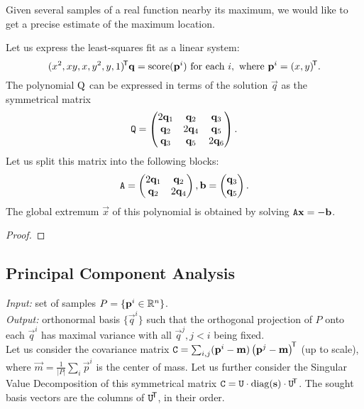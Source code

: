 Given several samples of a real function nearby its maximum, we would like to get a precise estimate of the maximum location.

Let us express the least-squares fit as a linear system:
$$(x^2, xy, x, y^2, y, 1)^{\!\mathsf{T}} \mathbf{q} = \mathrm{score}(\mathbf{p}^i) \text{ for each } i, \text{ where } \mathbf{p}^i = (x, y)^{\!\mathsf{T}}.$$
The polynomial $\mathrm{Q}$ can be expressed in terms of the solution $\vec q$ as the symmetrical matrix
$$\mathtt{Q} = \begin{pmatrix}
 2 \mathbf{q}_1 & \mathbf{q}_2 & \mathbf{q}_3 \\
 \mathbf{q}_2 & 2 \mathbf{q}_4 & \mathbf{q}_5 \\
 \mathbf{q}_3 & \mathbf{q}_5 & 2 \mathbf{q}_6
\end{pmatrix}.$$
Let us split this matrix into the following blocks:
\begin{equation}
\mathtt{A} = \begin{pmatrix}
 2 \mathbf{q}_1 & \mathbf{q}_2 \\
 \mathbf{q}_2 & 2 \mathbf{q}_4 \\
\end{pmatrix},
\mathbf{b} = \begin{pmatrix}
 \mathbf{q}_3 \\
 \mathbf{q}_5 \\
\end{pmatrix}.
\end{equation}
The global extremum $\vec x$ of this polynomial is obtained by solving $\mathtt{A} \mathbf{x} = -\mathbf{b}$.

\begin{proof}
\todo{\dots}
\end{proof}

\subsection{Principal Component Analysis}
\textit{Input:} set of samples $P = \{\mathbf{p}^i \in \mathbb{R}^n \}$.\\
\textit{Output:} orthonormal basis $\{\vec q^i\}$ such that the orthogonal projection of $P$ onto each $\vec q^i$ has maximal variance with all $\vec q^j, j < i$ being fixed.\\

Let us consider the covariance matrix $\mathtt{C} = \sum_{i,j} (\mathbf{p}^i - \mathbf{m}) \left(\mathbf{p}^j - \mathbf{m} \right) ^{\!\mathsf{T}}$ (up to scale), where $\vec m = \frac 1 {|P|} \sum_i \vec p^i$ is the center of mass. Let us further consider the Singular Value Decomposition of this symmetrical matrix $\mathtt{C} = \mathtt{U} \cdot \mathrm{diag}(\mathbf{s}) \cdot \mathtt{U}^{\!\mathsf{T}}$.
The sought basis vectors are the columns of $\mathtt{U}^{\!\mathsf{T}}$, in their order.

